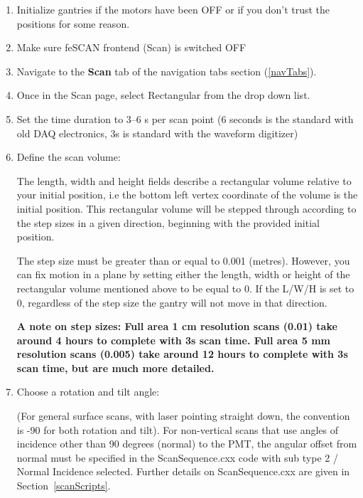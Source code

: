 \documentclass[twoside,letterpaper]{refart}
\begin{document}
\begin{enumerate}
	
	\item Initialize gantries if the motors have been OFF or if you don't trust the positions for some reason.
	
	\item Make sure feSCAN frontend (Scan) is switched OFF
	
	\item Navigate to the \textbf{Scan} tab of the navigation tabs section (\ref{navTabs}).	
	
	\item Once in the Scan page, select Rectangular from the drop down list.
	
	\item Set the time duration to 3--6 s per scan point (6 seconds is the standard with old DAQ electronics, 3s is standard with the waveform digitizer)
	
	\item Define the scan volume:
			
			The length, width and height fields describe a rectangular volume relative to your initial position, i.e the bottom left vertex coordinate of the volume is the initial position. This rectangular volume will be stepped through according to the step sizes in a given direction, beginning with the provided initial position.
			
			The step size must be greater than or equal to 0.001 (metres). However, you can fix motion in a plane by setting either the length, width or height of the rectangular volume mentioned above to be equal to 0. If the L/W/H is set to 0, regardless of the step size the gantry will not move in that direction.
			
			\textbf{A note on step sizes:
				Full area 1 cm resolution scans (0.01) take around 4 hours to complete with 3s scan time.
				Full area 5 mm resolution scans (0.005) take around 12 hours to complete with 3s scan time, but are much more detailed.}
				
	\item Choose a rotation and tilt angle:
	
			(For general surface scans, with laser pointing straight down, the convention is -90 for both rotation and tilt). For non-vertical scans that use angles of incidence other than 90 degrees (normal) to the PMT, the angular offset from normal must be specified in the ScanSequence.cxx code with sub type 2 / Normal Incidence selected. Further details on ScanSequence.cxx are given in Section~\ref{scanScripts}.
	

\end{enumerate}
\end{document}
